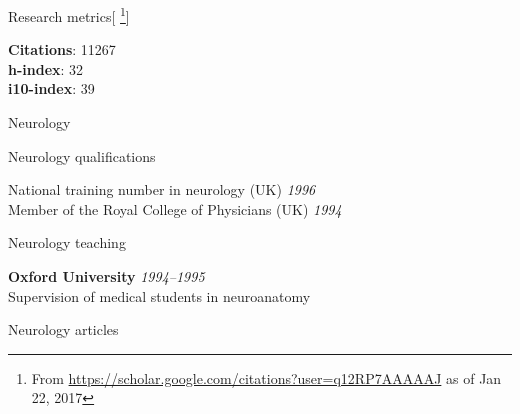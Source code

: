 \documentclass{cv}
\newcommand{\PlaceDateNote}[3]{{\bf #1} \hfill {\em #2} \\#3}
\begin{document}
\begin{cvSection}{Research metrics}[
    \footnote{ From
    \url{https://scholar.google.com/citations?user=q12RP7AAAAAJ} as of Jan 22,
2017}]

{\bf Citations}: 11267 \\
{\bf h-index}: 32 \\
{\bf i10-index}: 39

\end{cvSection}

\begin{cvSection}{Neurology}

\begin{cvSubSection}{Neurology qualifications}

National training number in neurology (UK) \hfill {\em 1996} \\
Member of the Royal College of Physicians (UK) \hfill {\em 1994}

\end{cvSubSection}

\begin{cvSubSection}{Neurology teaching}

\PlaceDateNote{Oxford University}{1994--1995}{
Supervision of medical students in neuroanatomy}

\end{cvSubSection}

\begin{cvSubSection}{Neurology articles}

\printbibliography[heading=none,
    keyword=neurology,
notkeyword=omit]

\end{cvSubSection}

\end{cvSection}
\end{document}
